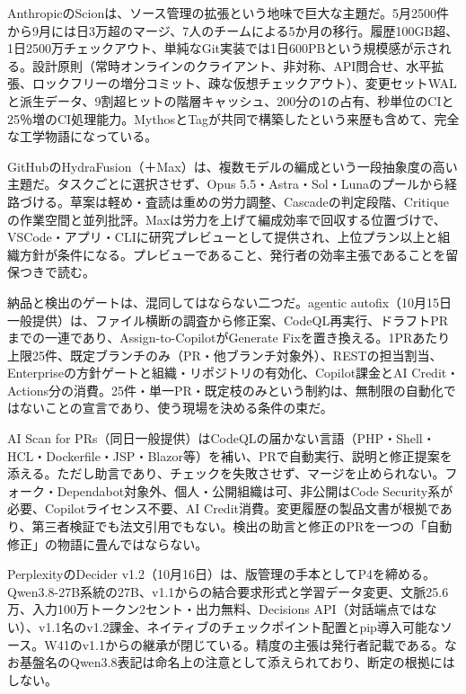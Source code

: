 \documentclass[lualatex,a4paper,10pt]{jlreq}
\begin{document}
AnthropicのScionは、ソース管理の拡張という地味で巨大な主題だ。5月2500件から9月には日3万超のマージ、7人のチームによる5か月の移行。履歴100GB超、1日2500万チェックアウト、単純なGit実装では1日600PBという規模感が示される。設計原則（常時オンラインのクライアント、非対称、API問合せ、水平拡張、ロックフリーの増分コミット、疎な仮想チェックアウト）、変更セットWALと派生データ、9割超ヒットの階層キャッシュ、200分の1の占有、秒単位のCIと25％増のCI処理能力。MythosとTagが共同で構築したという来歴も含めて、完全な工学物語になっている。
\cite{B32,B75}

GitHubのHydraFusion（＋Max）は、複数モデルの編成という一段抽象度の高い主題だ。タスクごとに選択させず、Opus 5.5・Astra・Sol・Lunaのプールから経路づける。草案は軽め・査読は重めの労力調整、Cascadeの判定段階、Critiqueの作業空間と並列批評。Maxは労力を上げて編成効率で回収する位置づけで、VSCode・アプリ・CLIに研究プレビューとして提供され、上位プラン以上と組織方針が条件になる。プレビューであること、発行者の効率主張であることを留保つきで読む。
\cite{B33,B76}

納品と検出のゲートは、混同してはならない二つだ。agentic autofix（10月15日一般提供）は、ファイル横断の調査から修正案、CodeQL再実行、ドラフトPRまでの一連であり、Assign-to-CopilotがGenerate Fixを置き換える。1PRあたり上限25件、既定ブランチのみ（PR・他ブランチ対象外）、RESTの担当割当、Enterpriseの方針ゲートと組織・リポジトリの有効化、Copilot課金とAI Credit・Actions分の消費。25件・単一PR・既定枝のみという制約は、無制限の自動化ではないことの宣言であり、使う現場を決める条件の束だ。
\cite{B34,B77}

AI Scan for PRs（同日一般提供）はCodeQLの届かない言語（PHP・Shell・HCL・Dockerfile・JSP・Blazor等）を補い、PRで自動実行、説明と修正提案を添える。ただし助言であり、チェックを失敗させず、マージを止められない。フォーク・Dependabot対象外、個人・公開組織は可、非公開はCode Security系が必要、Copilotライセンス不要、AI Credit消費。変更履歴の製品文書が根拠であり、第三者検証でも法文引用でもない。検出の助言と修正のPRを一つの「自動修正」の物語に畳んではならない。
\cite{B35,B78}

PerplexityのDecider v1.2（10月16日）は、版管理の手本としてP4を締める。Qwen3.8-27B系統の27B、v1.1からの結合要求形式と学習データ変更、文脈25.6万、入力100万トークン2セント・出力無料、Decisions API（対話端点ではない）、v1.1名のv1.2課金、ネイティブのチェックポイント配置とpip導入可能なソース。W41のv1.1からの継承が閉じている。精度の主張は発行者記載である。なお基盤名のQwen3.8表記は命名上の注意として添えられており、断定の根拠にはしない。
\cite{B37,B36,B38}
\end{document}
